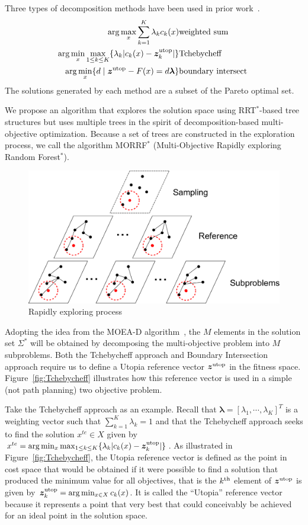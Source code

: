 \documentclass[phd]{byuprop}
\begin{document}
Three types of decomposition methods have been used in prior work~\cite{Zhang2007}.
\begin{eqnarray}
\arg\max_x \sum_{k=1}^{K} \lambda_{k} c_{k} (x) & {\rm weighted \ sum} \label{eq:weighted}\\
\arg\min_x\max_{1 \leq k \leq K}  \{ \lambda_{k} | c_{k}(x) - \bm{z}^{\rm utop}_{k}  | \} & {\rm Tchebycheff} \label{eq:Tchebycheff}\\
\arg\min_x \{ d \mid \bm{z}^{\rm utop} - F(x) = d \bm{\lambda} \} & {\rm boundary \ intersect\ } \label{eq:boundary}
\end{eqnarray}
The solutions generated by each method are a subset of the Pareto optimal set.

We propose an algorithm that explores the solution space using RRT$^{*}$-based tree structures but uses multiple trees in the spirit of decomposition-based multi-objective optimization.
Because a set of trees are constructed in the exploration process, we call the algorithm MORRF$^{*}$ (Multi-Objective Rapidly exploring Random Forest$^{*}$).

\begin{figure}
	\centering
	\includegraphics[width=0.55\linewidth]{./fig/MORRTstar}
	\caption{Rapidly exploring process}
	\label{fig:MORRTstar}
\end{figure}

Adopting the idea from the MOEA-D algorithm~\cite{Zhang2007}, the $M$ elements in the solution set $\Sigma^{*}$ will be obtained by decomposing the multi-objective problem into $ M $ subproblems.  
Both the Tchebycheff approach and Boundary Intersection approach require us to define a Utopia reference vector $ \bm{z}^{\rm utop} $ in the fitness space. 
Figure~\ref{fig:Tchebycheff} illustrates how this reference vector is used in a simple (not path planning) two objective problem.  

Take the Tchebycheff approach as an example.
Recall that  $ \bm{\lambda} = [ \lambda_{1} , \cdots , \lambda_{K}  ]^{T} $ is a weighting vector such that $ \sum_{k=1}^{K} \lambda_{k} = 1 $ and that the Tchebycheff approach seeks to find the solution $ x^{te}\in X $ given by $ x^{te} = \arg\min_x \max_{1 \leq k \leq K}  \{ \lambda_{k} | c_{k}(x) - \bm{z}^{\rm utop}_{k}  | \} $.  
As illustrated in Figure~\ref{fig:Tchebycheff}, the Utopia reference vector is defined as the point in cost space that would be obtained if it were possible to find a solution that produced the minimum value for all objectives, that is the $k^{\rm th}$ element of $\bm{z}^{\rm utop}$ is given by $\bm{z}^{\rm utop}_{k} = \arg \min_{x \in X} c_{k}(x)$.  
It is called the ``Utopia'' reference vector because it represents a point that very best that could conceivably be achieved for an ideal point in the solution space.
\end{document}
